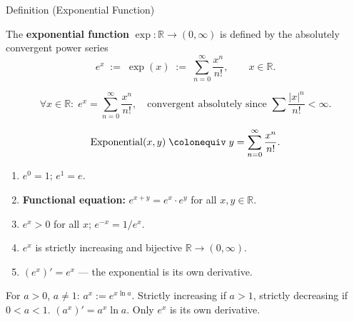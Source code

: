 \begin{definitionbox}{Definition (Exponential Function)}
\begin{definition}
\label{def:exponential}
The \textbf{exponential function} $\exp : \mathbb{R} \to (0,\infty)$
is defined by the absolutely convergent power series
\[
  e^x \;:=\; \exp(x) \;:=\; \sum_{n=0}^{\infty} \frac{x^n}{n!},
  \qquad x \in \mathbb{R}.
\]
\end{definition}
\end{definitionbox}\begin{remark*}
\[
  \forall x \in \mathbb{R} :\;
  e^x = \sum_{n=0}^\infty \frac{x^n}{n!},
  \quad \text{convergent absolutely since }
  \sum \frac{|x|^n}{n!} < \infty.
\]
\end{remark*}

\begin{remark*}
\[
  \operatorname{Exponential}(x, y)
  \;\colonequiv\;
  y = \sum_{n=0}^\infty \frac{x^n}{n!}.
\]
\end{remark*}

\begin{remark*}
\begin{enumerate}[label=(\roman*)]
  \item $e^0 = 1$;\; $e^1 = e$.
  \item \textbf{Functional equation:} $e^{x+y} = e^x \cdot e^y$
    for all $x, y \in \mathbb{R}$.
  \item $e^x > 0$ for all $x$;\; $e^{-x} = 1/e^x$.
  \item $e^x$ is strictly increasing and bijective
    $\mathbb{R} \to (0,\infty)$.
  \item $(e^x)' = e^x$ --- the exponential is its own derivative.
\end{enumerate}
\end{remark*}

\begin{remark*}
For $a > 0$, $a \neq 1$: $a^x := e^{x\ln a}$. Strictly increasing
if $a > 1$, strictly decreasing if $0 < a < 1$. $(a^x)' = a^x \ln a$.
Only $e^x$ is its own derivative.
\end{remark*}



